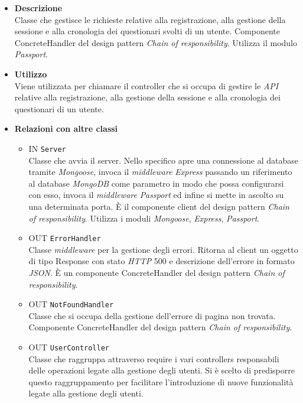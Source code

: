 	\begin{itemize}
		\item \textbf{Descrizione} \\
		Classe che gestisce le richieste relative alla registrazione, alla gestione della sessione e alla cronologia dei questionari svolti di un utente.
Componente ConcreteHandler del design pattern \textit{Chain of responsibility}. Utilizza il modulo \textit{Passport}.
		\item \textbf{Utilizzo} \\
		Viene utilizzata per chiamare il controller che si occupa di gestire le \textit{API} relative alla registrazione, alla gestione della sessione e alla cronologia dei questionari di un utente.
		\item \textbf{Relazioni con altre classi} 
		\begin{itemize}
		\item 
			IN	\texttt{Server}\\
			Classe che avvia il server. Nello specifico apre una connessione al database tramite \textit{Mongoose}, invoca il \textit{middleware} \textit{Express} passando un riferimento al database \textit{MongoDB} come parametro in modo che possa configurarsi con esso, invoca il \textit{middleware} \textit{Passport} ed infine si mette in ascolto su una determinata porta. È il componente client del design pattern \textit{Chain of responsibility}. Utilizza i moduli \textit{Mongoose}, \textit{Express}, \textit{Passport}. 
		\item 
			OUT \texttt{ErrorHandler}\\
			Classe \textit{middleware} per la gestione degli errori. Ritorna al client un oggetto di tipo Response con stato \textit{HTTP} 500 e descrizione dell’errore in formato \textit{JSON}. È un
componente ConcreteHandler del design pattern \textit{Chain of responsibility}.
		\item 
			OUT \texttt{NotFoundHandler}\\
			Classe che si occupa della gestione dell’errore di pagina non trovata. Componente ConcreteHandler del design pattern \textit{Chain of responsibility}.
		\item 
			OUT \texttt{UserController}\\
			Classe che raggruppa attraverso require i vari controllers responsabili delle operazioni legate alla gestione degli utenti. Si è scelto di predisporre questo raggruppamento per facilitare l'introduzione di nuove funzionalità legate alla gestione degli utenti.

\end{itemize}
\end{itemize}
